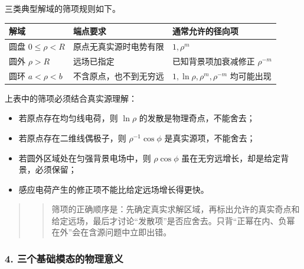 三类典型解域的筛项规则如下。

{\def\LTcaptype{none} %
\begin{longtable}[]{@{}
  >{\raggedright\arraybackslash}p{}
  >{\raggedright\arraybackslash}p{}
  >{\raggedright\arraybackslash}p{}@{}}
\toprule\noalign{}
\begin{minipage}[b]{\linewidth}\raggedright
解域
\end{minipage} & \begin{minipage}[b]{\linewidth}\raggedright
端点要求
\end{minipage} & \begin{minipage}[b]{\linewidth}\raggedright
通常允许的径向项
\end{minipage} \\
\midrule\noalign{}
\endhead
\bottomrule\noalign{}
\endlastfoot
圆盘 \(0\le\rho<R\) & 原点无真实源时电势有限 & \(1,\rho^m\) \\
圆外 \(\rho>R\) & 远场已指定 & 已知背景项加衰减修正 \(\rho^{-m}\) \\
圆环 \(a<\rho<b\) & 不含原点，也不到无穷远 &
\(1,\ln\rho,\rho^m,\rho^{-m}\) 均可能出现 \\
\end{longtable}
}

上表中的筛项必须结合真实源理解：

\begin{itemize}
\tightlist
\item
  若原点存在均匀线电荷，则 \(\ln\rho\) 的发散是物理奇点，不能舍去；
\item
  若原点存在二维线偶极子，则 \(\rho^{-1}\cos\phi\)
  是真实源项，不能舍去；
\item
  若圆外区域处在匀强背景电场中，则 \(\rho\cos\phi\)
  虽在无穷远增长，却是给定背景，必须保留；
\item
  感应电荷产生的修正项不能比给定远场增长得更快。
\end{itemize}

\begin{quote}
\begin{quote}
筛项的正确顺序是：先确定真实求解区域，再标出允许的真实奇点和给定远场，最后才讨论``发散项''是否应舍去。只背``正幂在内、负幂在外''会在含源问题中立即出错。
\end{quote}
\end{quote}

\subsubsection{4.
三个基础模态的物理意义}\label{m2:ux4e09ux4e2aux57faux7840ux6a21ux6001ux7684ux7269ux7406ux610fux4e49}

